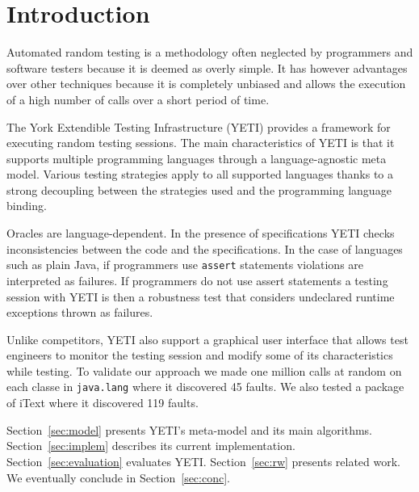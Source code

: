 \section{Introduction}\label{sec:intro}

Automated random testing is a methodology often neglected by 
programmers and software testers because it is deemed as overly
simple. It has however advantages over other techniques because 
it is completely unbiased and allows the execution of a high number 
of calls over a short period of time.


The York Extendible Testing Infrastructure (YETI) provides a framework 
for executing random testing sessions. The main characteristics of 
YETI is that it supports multiple programming languages through a 
language-agnostic meta model. Various testing strategies apply
to all supported languages thanks to a strong decoupling between the 
strategies used and the programming language binding. 

Oracles are language-dependent. In the presence of specifications YETI checks 
inconsistencies between the code and the specifications. In the case of 
languages such as plain Java, if programmers use \texttt{assert} statements 
violations are interpreted as failures. If programmers do not use assert 
statements a testing session with YETI is then a robustness test that
considers undeclared runtime exceptions thrown as failures.

Unlike competitors, YETI also support a graphical user interface that 
allows test engineers to monitor the testing session and modify some 
of its characteristics while testing. To validate our approach we made 
one million calls at random on each classe in \texttt{java.lang} where 
it discovered 45 faults. We also tested a package of iText where it 
discovered 119 faults. 


Section~\ref{sec:model} presents YETI's meta-model and its main algorithms.
Section~\ref{sec:implem} describes its current implementation.
Section~\ref{sec:evaluation} evaluates YETI.
Section~\ref{sec:rw} presents related work.
We eventually conclude in Section~\ref{sec:conc}.